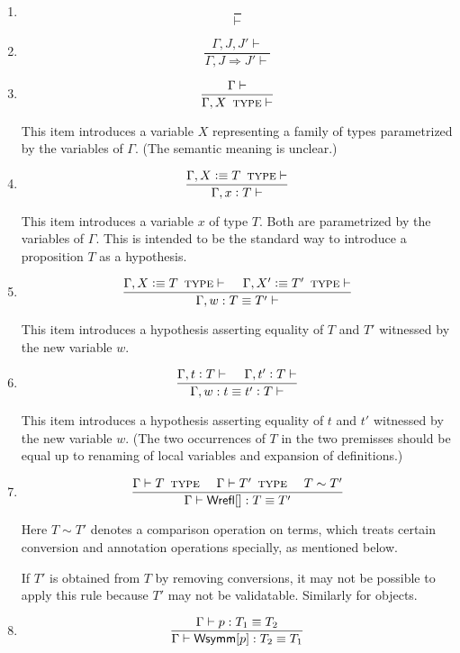 \documentclass[11pt]{article}
\newcommand{\eqd}{\equiv}
\newcommand{\spc}{{\,\,\,\,\,\,\,}}
\newcommand{\ccolon}[1]{\vcentcolon#1}
\newcommand{\ccheck}[1]{\vcentcolon#1}  %
\newcommand{\synth}[1]{\vcentcolon(\Rightarrow#1)} %
\renewcommand{\synth}[1]{\ccheck#1} %
\newcommand{\Type}{\mathop{\text{ \sc type}}}
\newcommand{\Okay}{\mathop{\text{ \sc okay}}}
\newcommand{\Context}{\vdash\Okay}
\renewcommand{\Context}{\vdash}
\newcommand{\ha}[2]{#1[#2]}
\newcommand{\Wrefl}{{\sf Wrefl}}
\newcommand{\Wsymm}{{\sf Wsymm}}
\newcommand{\defn}{\vcentcolon\equiv}
\begin{document}
\begin{enumerate}

\item
$$\frac{}{\Context}$$

\item
$$\frac{\Gamma,J,J'\Context}{\Gamma,J \Rightarrow J' \Context}$$

\item
$$\frac{\Gamma\Context}{\Gamma, X \Type \Context}$$

This item introduces a variable $X$ representing a family of types parametrized
by the variables of $\Gamma$.  (The semantic meaning is unclear.)

\item
$$\frac{\Gamma, X \defn T \Type \Context}{\Gamma, x \ccolon{T} \Context}$$

This item introduces a variable $x$ of type $T$.  Both are parametrized by the
variables of $\Gamma$.  This is intended to be the standard way to introduce a
proposition $T$ as a hypothesis.

\item
$$\frac{
  \Gamma, X \defn T \Type\Context  
  \spc
  \Gamma, X' \defn T' \Type\Context }
{\Gamma, w : T \eqd T' \Context}$$

This item introduces a hypothesis asserting equality of $T$ and $T'$ witnessed
by the new variable $w$.

\item
$$\frac{
  \Gamma, t \synth{T} \Context
  \spc
  \Gamma, t' \synth{T} \Context
  } {
  \Gamma, w : t \eqd t' \ccolon{T} \Context}$$

This item introduces a hypothesis asserting equality of $t$ and $t'$ witnessed
by the new variable $w$.  (The two occurrences of $T$ in the two premisses
should be equal up to renaming of local variables and expansion of definitions.)

\item 
$$\frac{\Gamma \vdash T \Type\spc \Gamma \vdash T'\Type \spc T\sim T'}{\Gamma\vdash \ha\Wrefl{}: T\eqd T'}$$

Here $T\sim T'$ denotes a comparison operation on terms, which treats certain
conversion and annotation operations specially, as mentioned below.

If $T'$ is obtained from $T$ by removing conversions, it may not be possible to apply
this rule because $T'$ may not be validatable.  Similarly for objects.

\item 
$$\frac{\Gamma\vdash p:T_1\eqd T_2}{\Gamma\vdash \ha\Wsymm{p}:T_2\eqd T_1}$$


\end{enumerate}
\end{document}
